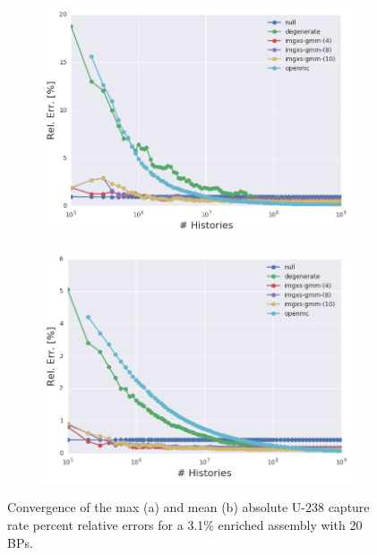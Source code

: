 \clearpage

\begin{figure}[h!]
\centering
\begin{subfigure}{\textwidth}
  \centering
  \includegraphics[width=0.9\linewidth]{figures/results/convergence/assm-31-20BPs/max-capt-err-evo}
  \caption{}
  \label{fig:chap11-assm-3.1-20BPs-capture-converge-max}
\end{subfigure}
\begin{subfigure}{\textwidth}
  \centering
  \includegraphics[width=0.9\linewidth]{figures/results/convergence/assm-31-20BPs/mean-capt-err-evo}
  \caption{}
  \label{fig:chap11-assm-3.1-20BPs-capture-converge-mean}
\end{subfigure}
\vspace{2mm}
\caption[Fission rate covergence for a 3.1\% enriched assembly with 20 \acp{BP}]{Convergence of the max (a) and mean (b) absolute U-238 capture rate percent relative errors for a 3.1\% enriched assembly with 20 \acp{BP}.}
\label{fig:chap11-assm-3.1-20BPs-capture-converge}
\end{figure}

